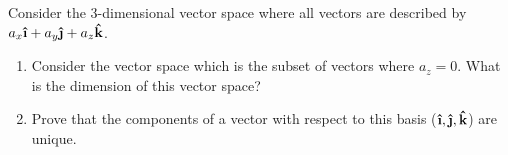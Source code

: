 \begin{problem}[2]
  Consider the 3-dimensional vector space where all vectors are described by \(a_x\ihat+a_y\jhat+a_z\khat\).
  \begin{enumerate}[label=\alph*)]
    \item{Consider the vector space which is the subset of vectors where \(a_z=0\). What is the dimension of this vector space?}
    \item{Prove that the components of a vector with respect to this basis (\(\ihat,\jhat,\khat\)) are unique.}
  \end{enumerate}
\end{problem}
